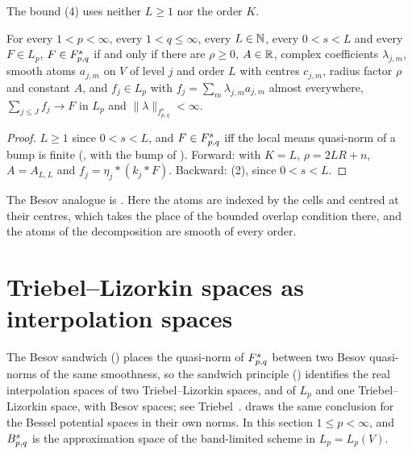 The bound (4) uses neither $L \geq 1$ nor the order $K$.

\begin{corollary}
\label{cor:tl-atomic}
\leanok
{}
For every $1 < p < \infty$, every $1 < q \leq \infty$, every $L \in \mathbb{N}$, every $0 < s < L$ and
every $F \in L_p$, $F \in F^{s}_{p,q}$ if and only if there are $\rho \geq 0$, $A \in \mathbb{R}$,
complex coefficients $\lambda_{j,m}$, smooth atoms $a_{j,m}$ on $V$ of level $j$ and order $L$
with centres $c_{j,m}$, radius factor $\rho$ and constant $A$, and $f_j \in L_p$ with
$f_j = \sum_m \lambda_{j,m} a_{j,m}$ almost everywhere, $\sum_{j \leq J} f_j \to F$ in $L_p$ and
$\|\lambda\|_{f^s_{p,q}} < \infty$.
\end{corollary}

\begin{proof}
\leanok
$L \geq 1$ since $0 < s < L$, and $F \in F^{s}_{p,q}$ iff the local means quasi-norm of a bump is
finite (, with the bump of ).
Forward:  with $K = L$, $\rho = 2LR + n$, $A = A_{L,L}$ and
$f_j = \eta_j * (k_j * F)$. Backward:  (2), since $0 < s < L$.
\end{proof}

The Besov analogue is . Here the atoms are indexed by the cells
and centred at their centres, which takes the place of the bounded overlap condition there, and
the atoms of the decomposition are smooth of every order.

\section{Triebel--Lizorkin spaces as interpolation spaces}
\label{sec:tl-interpolation}

The Besov sandwich () places the quasi-norm of $F^{s}_{p,q}$
between two Besov quasi-norms of the same smoothness, so the sandwich principle
() identifies the real interpolation spaces of two
Triebel--Lizorkin spaces, and of $L_p$ and one Triebel--Lizorkin space, with Besov spaces; see
Triebel~\cite[Section~2.4]{TriebelInterpolation}. 
draws the same conclusion for the Bessel potential spaces in their own norms. In this section
$1 \leq p < \infty$, and $B^{s}_{p,q}$ is the approximation space of the band-limited scheme
in $L_p = L_p(V)$.

